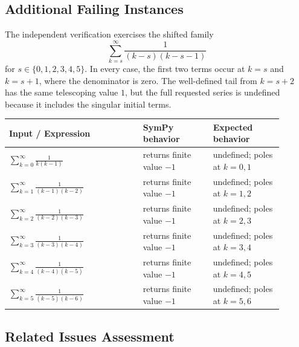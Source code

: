 \documentclass[11pt]{article}
\begin{document}
\subsection{Additional Failing Instances}

The independent verification exercises the shifted family
\[
  \sum_{k=s}^{\infty} \frac{1}{(k-s)(k-s-1)}
\]
for \(s \in \{0,1,2,3,4,5\}\). In every case, the first two terms occur at \(k=s\) and \(k=s+1\), where the denominator is zero. The well-defined tail from \(k=s+2\) has the same telescoping value \(1\), but the full requested series is undefined because it includes the singular initial terms.

\begin{center}
\small
\renewcommand{\arraystretch}{1.3}
\begin{tabular}{@{}>{\raggedright\arraybackslash}p{0.44\linewidth}>{\raggedright\arraybackslash}p{0.23\linewidth}>{\raggedright\arraybackslash}p{0.23\linewidth}@{}}
\toprule
\textbf{Input / Expression} & \textbf{SymPy behavior} & \textbf{Expected behavior} \\
\midrule
\(\displaystyle \sum_{k=0}^{\infty} \frac{1}{k(k-1)}\) & returns finite value \(-1\) & undefined; poles at \(k=0,1\) \\
\(\displaystyle \sum_{k=1}^{\infty} \frac{1}{(k-1)(k-2)}\) & returns finite value \(-1\) & undefined; poles at \(k=1,2\) \\
\(\displaystyle \sum_{k=2}^{\infty} \frac{1}{(k-2)(k-3)}\) & returns finite value \(-1\) & undefined; poles at \(k=2,3\) \\
\(\displaystyle \sum_{k=3}^{\infty} \frac{1}{(k-3)(k-4)}\) & returns finite value \(-1\) & undefined; poles at \(k=3,4\) \\
\(\displaystyle \sum_{k=4}^{\infty} \frac{1}{(k-4)(k-5)}\) & returns finite value \(-1\) & undefined; poles at \(k=4,5\) \\
\(\displaystyle \sum_{k=5}^{\infty} \frac{1}{(k-5)(k-6)}\) & returns finite value \(-1\) & undefined; poles at \(k=5,6\) \\
\bottomrule
\end{tabular}
\end{center}

\subsection{Related Issues Assessment}
\end{document}
